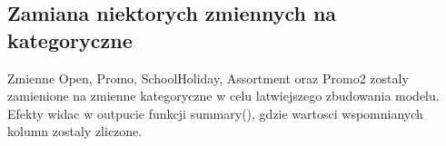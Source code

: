 \documentclass[]{article}
\newenvironment{Shaded}{\begin{snugshade}}{\end{snugshade}}
\newcommand{\DataTypeTok}[1]{\textcolor[rgb]{0.13,0.29,0.53}{#1}}
\newcommand{\KeywordTok}[1]{\textcolor[rgb]{0.13,0.29,0.53}{\textbf{#1}}}
\newcommand{\NormalTok}[1]{#1}
\newcommand{\OperatorTok}[1]{\textcolor[rgb]{0.81,0.36,0.00}{\textbf{#1}}}
\newcommand{\StringTok}[1]{\textcolor[rgb]{0.31,0.60,0.02}{#1}}
\begin{document}
\hypertarget{zamiana-niektorych-zmiennych-na-kategoryczne}{%
\subsection{Zamiana niektorych zmiennych na
kategoryczne}\label{zamiana-niektorych-zmiennych-na-kategoryczne}}

Zmienne Open, Promo, SchoolHoliday, Assortment oraz Promo2 zostaly
zamienione na zmienne kategoryczne w celu latwiejszego zbudowania
modelu. Efekty widac w outpucie funkcji summary(), gdzie wartosci
wspomnianych kolumn zostaly zliczone.

\begin{Shaded}
\end{Shaded}

\begin{Shaded}
\end{Shaded}
\end{document}
